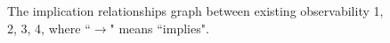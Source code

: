  \begin{figure}[thpb]
      \centering
      
      \caption{The implication relationships graph between existing observability 1, 2, 3, 4, where ``$\rightarrow$" means ``implies".}
      \label{fig:9}
   \end{figure}

